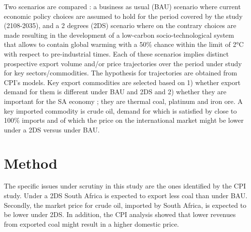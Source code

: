 \documentclass[12pt,english]{article}
\begin{document}
Two scenarios are compared : a business as usual (BAU) scenario where current economic policy choices are assumed to hold for the period covered by the study (2108-2035), %
and a 2 degrees (2DS) scenario where on the contrary choices are made resulting in the development of a low-carbon socio-technological system that allows to contain %
global warming with a 50\% chance within the limit of 2°C with respect to pre-industrial times. Each of these scenarios implies distinct prospective export volume and/or price trajectories over the period under study for key sectors/commodities. The hypothesis for trajectories are obtained from CPI's models. Key export commodities are selected based on 1) whether export demand for them is different under BAU and 2DS and 2) whether they are important for the SA economy ; they are thermal coal, platinum and iron ore. A key imported commodity is crude oil, demand for which is satisfied by close to 100\% imports and of which the price on the international market might be lower under a 2DS versus under BAU. 




\section{Method}

The specific issues under scrutiny in this study are the ones identified by the CPI study. Under a 2DS South Africa is expected to export less coal than under BAU. Secondly, the market price for crude oil, imported by South Africa, is expected to be lower under 2DS. In addition, the CPI analysis showed that lower revenues from exported coal might result in a higher domestic price. %

\end{document}
